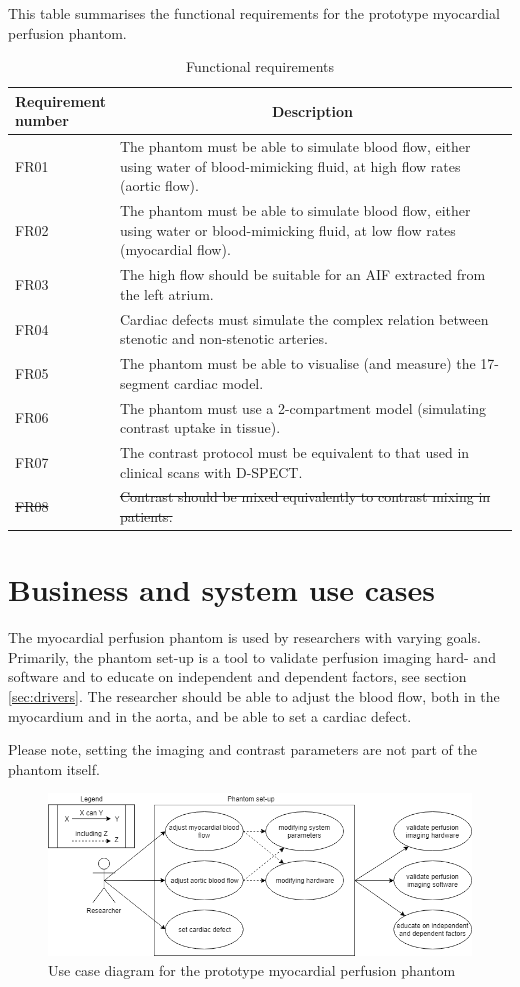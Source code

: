 \begin{table}[h]
\caption{Functional requirements}
\label{tab:funcreq}
This table summarises the functional requirements for the prototype myocardial perfusion phantom.
\begin{tabular}{l|p{120mm}|}
	\makecell[l]{Requirement \\ number} & \multicolumn{1}{c}{Description}\\
	\hline
	FR01 & The phantom must be able to simulate blood flow, either using water of blood-mimicking fluid, at high flow rates (aortic flow). \\ 
	\rowcolor{Gray}
	FR02 & The phantom must be able to simulate blood flow, either using water or blood-mimicking fluid, at low flow rates (myocardial flow). \\
	FR03 & The high flow should be suitable for an \ac{AIF} extracted from the left atrium. \\
	\rowcolor{Gray}
	FR04 & Cardiac defects must simulate the complex relation between stenotic and non-stenotic arteries. \\
	FR05 & The phantom must be able to visualise (and measure) the 17-segment cardiac model. \\
	\rowcolor{Gray}
	FR06 & The phantom must use a 2-compartment model (simulating contrast uptake in tissue). \\
	FR07 & The contrast protocol must be equivalent to that used in clinical scans with D-SPECT. \\
	\rowcolor{Gray}
	\sout{FR08} & \sout{Contrast should be mixed equivalently to contrast mixing in patients.} \\
	\cline{2-2}
\end{tabular}
\end{table}

\section{Business and system use cases}	
The myocardial perfusion phantom is used by researchers with varying goals. Primarily, the phantom set-up is a tool to validate perfusion imaging hard- and software and to educate on independent and dependent factors, see section \ref{sec:drivers}. The researcher should be able to adjust the blood flow, both in the myocardium and in the aorta, and be able to set a cardiac defect.

Please note, setting the imaging and contrast parameters are not part of the phantom itself. 
\begin{figure}[!h]
	\includegraphics[width=\textwidth]{./images/usecase_diagram.png}
	\caption{Use case diagram for the prototype myocardial perfusion phantom}
	\label{fig:usecase}
\end{figure}

